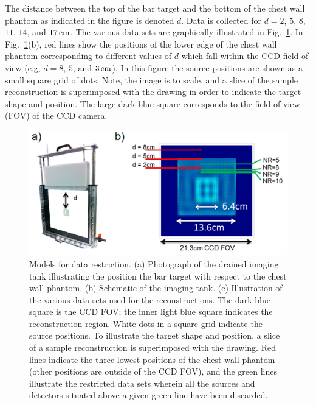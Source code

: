 The distance between the top of the bar target and the bottom of the chest wall phantom as indicated in the figure is denoted $d$. Data is collected for $d=2$, $5$, $8$, $11$, $14$, and $17\,{\rm cm}$. The various data sets are graphically illustrated in Fig.~\ref{fig:chestwallFOV}. In Fig.~\ref{fig:chestwallFOV}(b), red lines show the positions of the lower edge of the chest wall phantom corresponding to different values of $d$ which fall within the CCD field-of-view (e.g, $d=8$, $5$, and $3\,{\rm cm}$). In this figure the source positions are shown as a small square grid of dots. Note, the image is to scale, and a slice of the sample reconstruction is superimposed with the drawing in order to indicate the target shape and position. The large dark blue square corresponds to the field-of-view (FOV) of the CCD camera. 
\begin{figure}[t]
\centering\includegraphics[width=13cm]{./figures/3_Chestwall/chestwallFOV.png}
\caption[Models for data restriction]{\label{fig:chestwallFOV}
Models for data restriction. (a) Photograph of the drained imaging tank illustrating the position the bar target with respect to the chest wall phantom. (b) Schematic of the imaging tank. (c) Illustration of the various data sets used for the reconstructions. The dark blue square is the CCD FOV; the inner light blue square indicates the reconstruction region. White dots in a square grid indicate the source positions. To illustrate the target shape and position, a slice of a sample reconstruction is superimposed with the drawing. Red lines indicate the three lowest positions of the chest wall phantom (other positions are outside of the CCD FOV), and the green lines illustrate the restricted data sets wherein all the sources and detectors situated above a given green line have been discarded.}
\end{figure}

